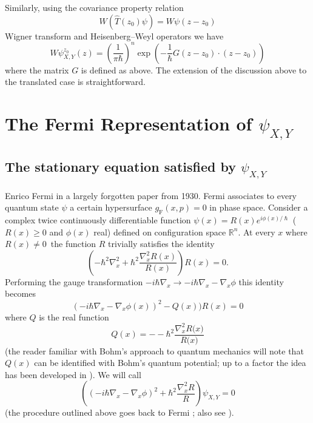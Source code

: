 \documentclass[11pt]{article}%
\begin{document}
Similarly, using the covariance property relation
\[
W(\widehat{T}(z_{0})\psi)=W\psi(z-z_{0})
\]
Wigner transform and Heisenberg--Weyl operators we have
\[
W\psi_{X,Y}^{z_{0}}(z)=\left(  \frac{1}{\pi\hbar}\right)  ^{n}\exp\left(
-\frac{1}{\hbar}G(z-z_{0})\cdot(z-z_{0})\right)
\]
where the matrix $G$ is defined as above. The extension of the discussion
above to the translated case is straightforward.

\section{The Fermi Representation of $\psi_{X,Y}$}

\subsection{The stationary equation satisfied by $\psi_{X,Y}$}

Enrico Fermi in a largely forgotten paper \cite{Fermi} from 1930. Fermi
associates to every quantum state $\psi$ a certain hypersurface $g_{\mathrm{F}%
}(x,p)=0$ in phase space. Consider a complex twice continuously differentiable
function $\psi(x)=R(x)e^{i\phi(x)/\hslash}$ ($R(x)\geq0$ and $\phi(x)$ real)
defined on configuration space $\mathbb{R}^{n}$. At every $x$ where
$R(x)\neq0$\ the function $R$ trivially satisfies the identity
\begin{equation}
\left(  -\hbar^{2}\nabla_{x}^{2}+\hbar^{2}\frac{\nabla_{x}^{2}R(x)}%
{R(x)}\right)  R(x)=0. \label{fermi1}%
\end{equation}
Performing the gauge transformation $-i\hbar\nabla_{x}\longrightarrow
-i\hbar\nabla_{x}-\nabla_{x}\phi$ this identity becomes
\begin{equation}
\left(  -i\hbar\nabla_{x}-\nabla_{x}\phi(x)\right)  ^{2}-Q(x))R(x)=0
\label{16}%
\end{equation}
where $Q$ is the real function%
\begin{equation}
Q(x)=--\hbar^{2}\frac{\nabla_{x}^{2}R(x\mathbf{)}}{R\mathbf{(}x\mathbf{)}}%
\end{equation}
(the reader familiar with Bohm's approach to quantum mechanics will note that
$Q(x)$ can be identified with Bohm's quantum potential; up to a factor the
idea has been developed in \cite{DeGoHi}). We will call
\begin{equation}
\left(  \left(  -i\hbar\nabla_{x}-\nabla_{x}\phi\right)  ^{2}+\hbar^{2}%
\frac{\nabla_{x}^{2}R}{R}\right)  \psi_{X,Y}=0 \label{fermiop}%
\end{equation}
(the procedure outlined above goes back to Fermi \cite{Fermi}; also see
\cite{best}).
\end{document}
